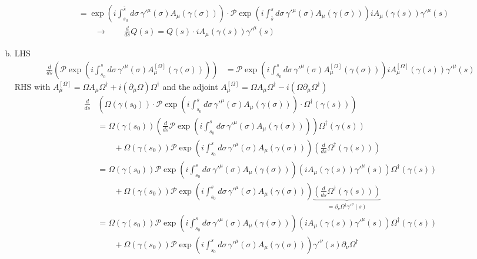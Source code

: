 \documentclass[10pt,a4paper]{article}
\theoremstyle{definition}
\begin{document}
\begin{enumerate}[a.)]
\begin{align}
&=\exp \left( i \int_{s_0}^{\bar{s}} d\sigma\, \gamma'^\mu(\sigma) A_\mu(\gamma(\sigma)) \right)
\cdot
\mathcal{P} \exp \left( i \int_{\bar{s}}^{s} d\sigma\, \gamma'^\mu(\sigma) A_\mu(\gamma(\sigma)) \right)iA_\mu(\gamma(s))\gamma'^{\mu}(s)\\
&\qquad\rightarrow\qquad\frac{d}{ds}Q(s)
=Q(s)\cdot iA_\mu(\gamma(s))\gamma'^{\mu}(s)
\end{align}
\item LHS
\begin{align}
\frac{d}{ds}\left(\mathcal{P}\exp\left(i\int_{s_0}^s d\sigma\,\gamma'^{\mu}(\sigma)A^{[\Omega]}_\mu(\gamma(\sigma))\right)\right)
&=\mathcal{P}\exp\left(i\int_{s_0}^s d\sigma\,\gamma'^{\mu}(\sigma)A^{[\Omega]}_\mu(\gamma(\sigma))\right)iA^{[\Omega]}_\mu(\gamma(s))\gamma'^{\mu}(s)
\end{align}
RHS with $A_\mu^{[\Omega]} = \Omega A_\mu \Omega^\dagger + i (\partial_\mu \Omega) \Omega^\dagger$ and the adjoint $A_\mu^{[\Omega]} = \Omega A_\mu \Omega^\dagger - i (\Omega\partial_\mu \Omega^\dagger) $
\begin{align}
\frac{d}{ds}&\left(\Omega(\gamma(s_0))
\cdot
\mathcal{P} \exp\left( i \int_{s_0}^s d\sigma\, \gamma'^\mu(\sigma) A_\mu(\gamma(\sigma)) \right)
\cdot
\Omega^\dagger(\gamma(s)) \right)\\
&=\Omega(\gamma(s_0))\left(\frac{d}{ds}\mathcal{P} \exp\left( i \int_{s_0}^s d\sigma\, \gamma'^\mu(\sigma) A_\mu(\gamma(\sigma)) \right)\right)\Omega^\dagger(\gamma(s))\\
&\qquad+\Omega(\gamma(s_0))\mathcal{P} \exp\left( i \int_{s_0}^s d\sigma\, \gamma'^\mu(\sigma) A_\mu(\gamma(\sigma)) \right)\left(\frac{d}{ds}\Omega^\dagger(\gamma(s))\right)\\
&=\Omega(\gamma(s_0))\mathcal{P} \exp\left( i \int_{s_0}^s d\sigma\, \gamma'^\mu(\sigma) A_\mu(\gamma(\sigma)) \right)\left(iA_\mu(\gamma(s))\gamma'^{\mu}(s)\right)\Omega^\dagger(\gamma(s))\\
&\qquad+\Omega(\gamma(s_0))\mathcal{P} \exp\left( i \int_{s_0}^s d\sigma\, \gamma'^\mu(\sigma) A_\mu(\gamma(\sigma)) \right)\underbrace{\left(\frac{d}{ds}\Omega^\dagger(\gamma(s))\right)}_{=\partial_\nu\Omega^\dagger\gamma'^\nu(s)}\\
&=\Omega(\gamma(s_0))\mathcal{P} \exp\left( i \int_{s_0}^s d\sigma\, \gamma'^\mu(\sigma) A_\mu(\gamma(\sigma)) \right)\left(iA_\mu(\gamma(s))\gamma'^{\mu}(s)\right)\Omega^\dagger(\gamma(s))\\
&\qquad+\Omega(\gamma(s_0))\mathcal{P} \exp\left( i \int_{s_0}^s d\sigma\, \gamma'^\mu(\sigma) A_\mu(\gamma(\sigma)) \right)\gamma'^\nu(s)\partial_\nu\Omega^\dagger\\

\end{align}
\end{enumerate}
\end{document}
